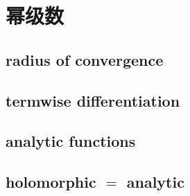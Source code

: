 \section{幂级数}
\label{b3:sec:0102}


\subsection{radius of convergence}
\label{b3:subsec:010201}

\subsection{termwise differentiation}
\label{b3:subsec:010202}

\subsection{analytic functions}
\label{b3:subsec:010203}

\subsection{holomorphic \texorpdfstring{\(=\)}{=} analytic}
\label{b3:subsec:010204}


